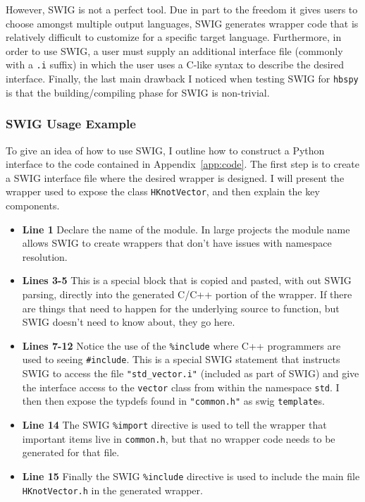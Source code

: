   However, SWIG is not a perfect tool. Due in part to the freedom it gives users to choose amongst multiple output languages, SWIG generates wrapper code that is relatively difficult to customize for a specific target language. Furthermore, in order to use SWIG, a user must supply an additional interface file (commonly with a \texttt{.i} suffix) in which the user uses a C-like syntax to describe the desired interface. Finally, the last main drawback I noticed when testing SWIG for \texttt{hbspy} is that the building/compiling phase for SWIG is non-trivial.

  \subsubsection{SWIG Usage Example} \label{ssub:swig_usage_example}

    To give an idea of how to use SWIG, I outline how to construct a Python interface to the code contained in Appendix~\ref{app:code}. The first step is to create a SWIG interface file where the desired wrapper is designed. I will present the wrapper used to expose the class \texttt{HKnotVector}, and then explain the key components.

    \vspace{.2in}
    

    \begin{itemize}
      \item \textbf{Line 1} Declare the name of the module. In large projects the module name allows SWIG to create wrappers that don't have issues with namespace resolution.
      \item \textbf{Lines 3-5} This is a special block that is copied and pasted, with out SWIG parsing, directly into the generated C/C++ portion of the wrapper. If there are things that need to happen for the underlying source to function, but SWIG doesn't need to know about, they go here.
      \item \textbf{Lines 7-12} Notice the use of the \texttt{\%include} where C++ programmers are used to seeing \texttt{\#include}. This is a special SWIG statement that instructs SWIG to access the file \texttt{"std\_vector.i"} (included as part of SWIG) and give the interface access to the \texttt{vector} class from within the namespace \texttt{std}. I then then expose the typdefs found in \texttt{"common.h"} as swig \texttt{template}s.
      \item \textbf{Line 14} The SWIG \texttt{\%import} directive is used to tell the wrapper that important items live in \texttt{common.h}, but that no wrapper code needs to be generated for that file.
      \item \textbf{Line 15} Finally the SWIG \texttt{\%include} directive is used to include the main file \texttt{HKnotVector.h} in the generated wrapper.
    \end{itemize}
    \mainstretch{}

